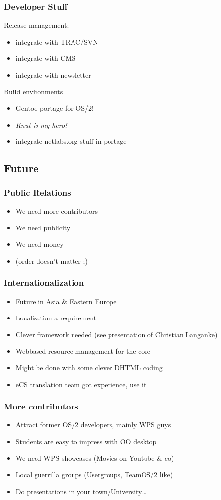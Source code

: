 \documentclass{beamer}
\begin{document}
\begin{frame}
\frametitle{Developer Stuff}
Release management:
\begin{itemize}[<+->]
  \item integrate with TRAC/SVN
  \item integrate with CMS
  \item integrate with newsletter
\end{itemize}
Build environments
\begin{itemize}[<+->]
  \item Gentoo portage for OS/2!
  \item \textit{Knut is my hero!}
  \item integrate netlabs.org stuff in portage
\end{itemize}
\end{frame}

\subsection{Future}
\begin{frame}
\frametitle{Public Relations}
\begin{itemize}[<+->]
  \item We need more contributors
  \item We need publicity
  \item We need money
  \item (order doesn't matter ;)
\end{itemize}
\end{frame}

\begin{frame}
\frametitle{Internationalization}
\begin{itemize}[<+->]
  \item Future in Asia \& Eastern Europe
  \item Localisation a requirement
  \item Clever framework needed (see presentation of Christian Langanke)
  \item Webbased resource management for the core
  \item Might be done with some clever DHTML coding
  \item eCS translation team got experience, use it
\end{itemize}
\end{frame}

\begin{frame}
\frametitle{More contributors}
\begin{itemize}[<+->]
  \item Attract former OS/2 developers, mainly WPS guys
  \item Students are easy to impress with OO desktop
  \item We need WPS showcases (Movies on Youtube \& co)
  \item Local guerrilla groups (Usergroups, TeamOS/2 like)
  \item Do presentations in your town/University\ldots
\end{itemize}
\end{frame}
\end{document}
